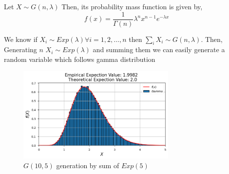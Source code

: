 \begin{example}
    Let $X\sim G(n,\lambda)$ Then, its probability  mass function is given by,
    \[
        f(x) = \frac{1}{\Gamma(n)}\lambda^{n}x^{n-1}e^{-\lambda x}
    \] 

    We know if $X_i\sim Exp(\lambda) \forall i = 1,2, \ldots ,n$ then  $\sum_i X_i \sim G(n,\lambda)$. Then, Generating  $n$ $X_i\sim Exp(\lambda)$ 
    and summing them we can easily generate a random variable which follows gamma distribution
    \begin{figure}[H]
        
        \centering
        \includegraphics[width=0.7\textwidth]{images/gamma_ITA.png}
        \caption{$G(10,5)$ generation by sum of $Exp(5)$}
    \end{figure}
\end{example}
